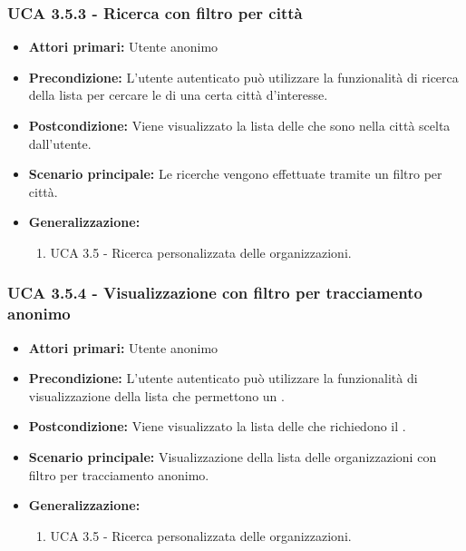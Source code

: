 \subsubsection{UCA 3.5.3 - Ricerca con filtro per città}%
\begin{itemize}
	\item \textbf{Attori primari:} Utente anonimo
	\item \textbf{Precondizione:} L'utente autenticato può utilizzare la funzionalità di ricerca della lista per cercare le  di una certa città d'interesse.
	\item \textbf{Postcondizione:} Viene visualizzato la lista delle  che sono nella città scelta dall'utente.
	\item \textbf{Scenario principale:} Le ricerche vengono effettuate tramite un filtro per città.
	\item \textbf{Generalizzazione:}
	\begin{enumerate}
	\item UCA 3.5 - Ricerca personalizzata delle organizzazioni.
	\end{enumerate}	
\end{itemize}

\subsubsection{UCA 3.5.4 - Visualizzazione con filtro per tracciamento anonimo}%
\begin{itemize}
	\item \textbf{Attori primari:} Utente anonimo
	\item \textbf{Precondizione:} L'utente autenticato può utilizzare la funzionalità di visualizzazione della lista che permettono un .
	\item \textbf{Postcondizione:} Viene visualizzato la lista delle  che richiedono il .
	\item \textbf{Scenario principale:} Visualizzazione della lista delle organizzazioni con filtro per tracciamento anonimo.
	\item \textbf{Generalizzazione:}
	\begin{enumerate}
	\item UCA 3.5 - Ricerca personalizzata delle organizzazioni.
	\end{enumerate}	
\end{itemize}

